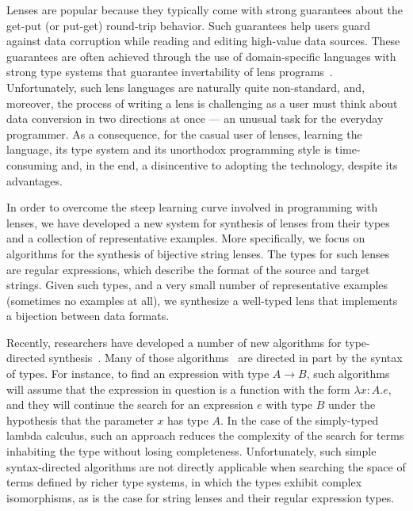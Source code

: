 Lenses are popular because they typically come with strong guarantees
about the get-put (or put-get) round-trip behavior.  Such guarantees
help users guard against data corruption while reading and editing
high-value data sources.  These guarantees are often achieved through
the use of domain-specific languages with strong type systems that
guarantee invertability of lens programs~\cite{?,?,?}.  Unfortunately, such
lens languages are naturally quite non-standard, and, moreover, the
process of writing a lens is challenging as a user must think
about data conversion in two directions at once --- an
unusual task for the everyday programmer.  As a consequence, 
for the casual user of lenses, learning the language, its type system and its
unorthodox programming style is time-consuming and, in the end,
a disincentive to adopting the technology, despite its advantages.

In order to overcome the steep learning curve involved in programming
with lenses, we have developed a new system for synthesis of lenses
from their types and a collection of representative examples.  More
specifically, we focus on algorithms for the synthesis of bijective
string lenses.  The types for such lenses are regular expressions,
which describe the format of the source and target strings.  Given
such types, and a very small number of representative examples (sometimes
no examples at all), we synthesize a well-typed lens that implements
a bijection between data formats.

Recently, researchers have developed a number of new algorithms for
type-directed synthesis~\cite{?,?,?}.  Many of those
algorithms~\cite{osera+:pldi15,frankle+:popl16,armando+:pldi16} are
directed in part by the syntax of types.  For instance, to find an
expression with type $A \rightarrow B$, such algorithms will assume
that the expression in question is a function with the form $\lambda
x{:}A. e$, and they will continue the search for an expression $e$
with type $B$ under the hypothesis that the parameter $x$ has type
$A$.  In the case of the simply-typed lambda calculus, such an
approach reduces the complexity of the search for terms inhabiting the
type without losing completeness.  Unfortunately, such simple
syntax-directed algorithms are not directly applicable when searching
the space of terms defined by richer type systems, in which the types
exhibit complex isomorphisms, as is the case for string lenses and
their regular expression types. 

